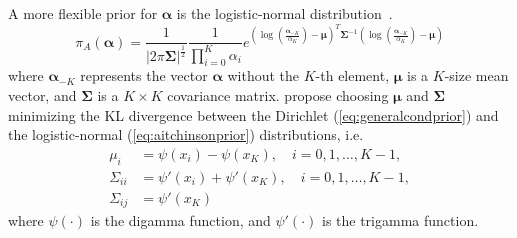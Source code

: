 \documentclass[a4paper, notitlepage, 10pt]{article}
\begin{document}
A more flexible prior for $\boldsymbol\alpha$ is the logistic-normal distribution~\citep{aitchson1980}. 
\begin{equation}
 \label{eq:aitchinsonprior}
 \pi_A(\boldsymbol\alpha) = \frac{1}{|2\pi \boldsymbol \Sigma|^{\frac{1}{2}}}\frac{1}{\prod_{i=0}^K \alpha_i}
  e^{
     \left(\log\left(\frac{\boldsymbol \alpha_{-K}}{\alpha_K}\right) - \boldsymbol \mu\right)^T
     {\boldsymbol \Sigma}^{-1}
     \left(\log\left(\frac{\boldsymbol \alpha_{-K}}{\alpha_K}\right) - \boldsymbol \mu\right)
     }
\end{equation}
where $\boldsymbol \alpha_{-K}$ represents the vector $\boldsymbol \alpha$ without the $K$-th element, $\boldsymbol \mu$ is a $K$-size mean vector, and $\boldsymbol \Sigma$ is a $K \times K$ covariance matrix.
\citet{aitchson1980} propose choosing $\boldsymbol \mu$ and $\boldsymbol \Sigma$ minimizing the KL divergence between the Dirichlet (\ref{eq:generalcondprior}) and the logistic-normal (\ref{eq:aitchinsonprior}) distributions, i.e.
\begin{align}
 \label{eq:momentmatching}
 \mu_i & = \psi(x_i) - \psi(x_K), \quad i=0,1,\ldots,K-1, \\
 \Sigma_{ii} & = \psi'(x_i) + \psi'(x_K), \quad i=0,1,\ldots,K-1, \\
 \Sigma_{ij} & = \psi'(x_K)
\end{align}
where $\psi(\cdot)$ is the digamma function, and $\psi'(\cdot)$ is the trigamma function.

%
%
\end{document}

